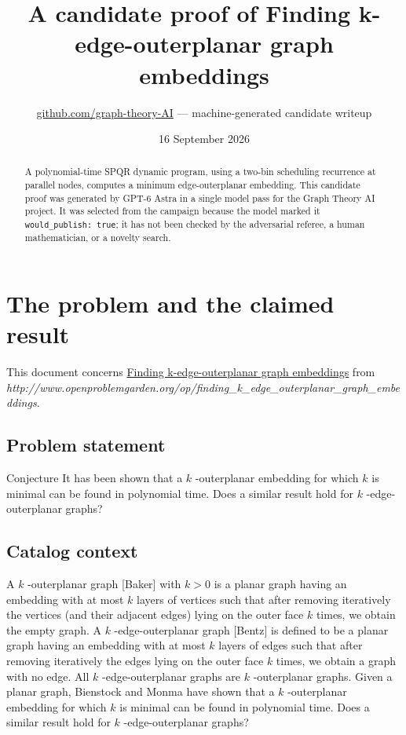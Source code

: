 \documentclass[
  11pt,
  a4paper,
]{article}
\title{A candidate proof of Finding k-edge-outerplanar graph embeddings}
\author{\href{https://github.com/graph-theory-AI}{github.com/graph-theory-AI}
--- machine-generated candidate writeup}
\date{16 September 2026}
\begin{document}
\maketitle
\begin{abstract}
A polynomial-time SPQR dynamic program, using a two-bin scheduling
recurrence at parallel nodes, computes a minimum edge-outerplanar
embedding. This candidate proof was generated by GPT-6 Astra in a single
model pass for the Graph Theory AI project. It was selected from the
campaign because the model marked it \texttt{would\_publish:\ true}; it
has not been checked by the adversarial referee, a human mathematician,
or a novelty search.
\end{abstract}

\section{The problem and the claimed
result}\label{the-problem-and-the-claimed-result}

This document concerns
\href{https://graph-theory-ai.github.io/graph-conjectures/op/finding_k_edge_outerplanar_graph_embeddings/}{Finding
k-edge-outerplanar graph embeddings} from
\emph{http://www.openproblemgarden.org/op/finding\_k\_edge\_outerplanar\_graph\_embeddings}.

\subsection{Problem statement}\label{problem-statement}

Conjecture It has been shown that a \(k\) -outerplanar embedding for
which \(k\) is minimal can be found in polynomial time. Does a similar
result hold for \(k\) -edge-outerplanar graphs?

\subsection{Catalog context}\label{catalog-context}

A \(k\) -outerplanar graph {[}Baker{]} with \(k > 0\) is a planar graph
having an embedding with at most \(k\) layers of vertices such that
after removing iteratively the vertices (and their adjacent edges) lying
on the outer face \(k\) times, we obtain the empty graph. A \(k\)
-edge-outerplanar graph {[}Bentz{]} is defined to be a planar graph
having an embedding with at most \(k\) layers of edges such that after
removing iteratively the edges lying on the outer face \(k\) times, we
obtain a graph with no edge. All \(k\) -edge-outerplanar graphs are
\(k\) -outerplanar graphs. Given a planar graph, Bienstock and Monma
have shown that a \(k\) -outerplanar embedding for which \(k\) is
minimal can be found in polynomial time. Does a similar result hold for
\(k\) -edge-outerplanar graphs?
\end{document}
